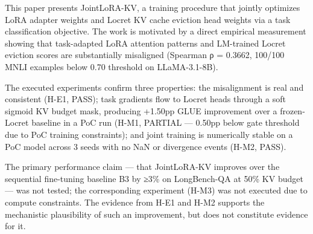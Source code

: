 
This paper presents JointLoRA-KV, a training procedure that jointly optimizes LoRA adapter weights and Locret KV cache eviction head weights via a task classification objective. The work is motivated by a direct empirical measurement showing that task-adapted LoRA attention patterns and LM-trained Locret eviction scores are substantially misaligned (Spearman ρ = 0.3662, 100/100 MNLI examples below 0.70 threshold on LLaMA-3.1-8B).

The executed experiments confirm three properties: the misalignment is real and consistent (H-E1, PASS); task gradients flow to Locret heads through a soft sigmoid KV budget mask, producing +1.50pp GLUE improvement over a frozen-Locret baseline in a PoC run (H-M1, PARTIAL — 0.50pp below gate threshold due to PoC training constraints); and joint training is numerically stable on a PoC model across 3 seeds with no NaN or divergence events (H-M2, PASS).

The primary performance claim — that JointLoRA-KV improves over the sequential fine-tuning baseline B3 by ≥3\% on LongBench-QA at 50\% KV budget — was not tested; the corresponding experiment (H-M3) was not executed due to compute constraints. The evidence from H-E1 and H-M2 supports the mechanistic plausibility of such an improvement, but does not constitute evidence for it.

